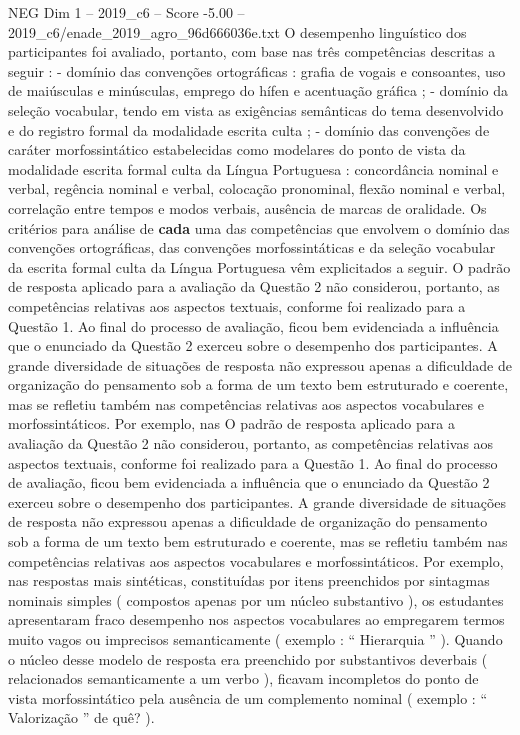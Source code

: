 \begin{textsample}{NEG Dim 1 – 2019\_c6 – Score -5.00 – 2019\_c6/enade\_2019\_agro\_96d666036e.txt}
O desempenho linguístico dos participantes foi avaliado, portanto, com base nas três competências descritas a seguir : - domínio das convenções ortográficas : grafia de vogais e consoantes, uso de maiúsculas e minúsculas, emprego do hífen e acentuação gráfica ; - domínio da seleção vocabular, tendo em vista as exigências semânticas do tema desenvolvido e do registro formal da modalidade escrita culta ; - domínio das convenções de caráter morfossintático estabelecidas como modelares do ponto de vista da modalidade escrita formal culta da Língua Portuguesa : concordância nominal e verbal, regência nominal e verbal, colocação pronominal, flexão nominal e verbal, correlação entre tempos e modos verbais, ausência de marcas de oralidade.
Os critérios para análise de \textbf{cada} uma das competências que envolvem o domínio das convenções ortográficas, das convenções morfossintáticas e da seleção vocabular da escrita formal culta da Língua Portuguesa vêm explicitados a seguir.
O padrão de resposta aplicado para a avaliação da Questão 2 não considerou, portanto, as competências relativas aos aspectos textuais, conforme foi realizado para a Questão 1.
Ao final do processo de avaliação, ficou bem evidenciada a influência que o enunciado da Questão 2 exerceu sobre o desempenho dos participantes.
A grande diversidade de situações de resposta não expressou apenas a dificuldade de organização do pensamento sob a forma de um texto bem estruturado e coerente, mas se refletiu também nas competências relativas aos aspectos vocabulares e morfossintáticos.
Por exemplo, nas O padrão de resposta aplicado para a avaliação da Questão 2 não considerou, portanto, as competências relativas aos aspectos textuais, conforme foi realizado para a Questão 1.
Ao final do processo de avaliação, ficou bem evidenciada a influência que o enunciado da Questão 2 exerceu sobre o desempenho dos participantes.
A grande diversidade de situações de resposta não expressou apenas a dificuldade de organização do pensamento sob a forma de um texto bem estruturado e coerente, mas se refletiu também nas competências relativas aos aspectos vocabulares e morfossintáticos.
Por exemplo, nas respostas mais sintéticas, constituídas por itens preenchidos por sintagmas nominais simples ( compostos apenas por um núcleo substantivo ), os estudantes apresentaram fraco desempenho nos aspectos vocabulares ao empregarem termos muito vagos ou imprecisos semanticamente ( exemplo : “ Hierarquia ” ).
Quando o núcleo desse modelo de resposta era preenchido por substantivos deverbais ( relacionados semanticamente a um verbo ), ficavam incompletos do ponto de vista morfossintático pela ausência de um complemento nominal ( exemplo : “ Valorização ” de quê? ).

\end{textsample}
